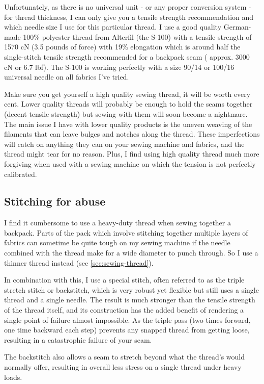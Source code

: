 Unfortunately, as there is no universal unit - or any proper conversion system - for thread thickness, I can only give you a tensile strength recommendation and which needle size I use for this particular thread. I use a good quality German-made 100\% polyester thread from Alterfil (the S-100) with a tensile strength of 1570 cN (3.5 pounds of force) with 19\% elongation which is around half the single-stitch tensile strength recommended for a backpack seam ( approx. 3000 cN or 6.7 lbf). The S-100 is working perfectly with a size 90/14 or 100/16 universal needle on all fabrics I've tried.



Make sure you get yourself a high quality sewing thread, it will be worth every cent. Lower quality threads will probably be enough to hold the seams together (decent tensile strength) but sewing with them will soon become a nightmare. The main issue I have with lower quality products is the uneven weaving of the filaments that can leave bulges and notches along the thread. These imperfections will catch on anything they can on your sewing machine and fabrics, and the thread might tear for no reason. Plus, I find using high quality thread much more forgiving when used with a sewing machine on which the tension is not perfectly calibrated.

\subsection{Stitching for abuse} \label{sec:stitching-for-abuse}

I find it cumbersome to use a heavy-duty thread when sewing together a backpack. Parts of the pack which involve stitching together multiple layers of fabrics can sometime be quite tough on my sewing machine if the needle combined with the thread make for a wide diameter to punch through. So I use a thinner thread instead (see \ref{sec:sewing-thread}).

In combination with this, I use a special stitch, often referred to as the triple stretch stitch or backstitch, which is very robust yet flexible but still uses a single thread and a single needle. The result is much stronger than the tensile strength of the thread itself, and its construction has the added benefit of rendering a single point of failure almost impossible. As the triple pass (two times forward, one time backward each step) prevents any snapped thread from getting loose, resulting in a catastrophic failure of your seam.

The backstitch also allows a seam to stretch beyond what the thread's would normally offer, resulting in overall less stress on a single thread under heavy loads.

